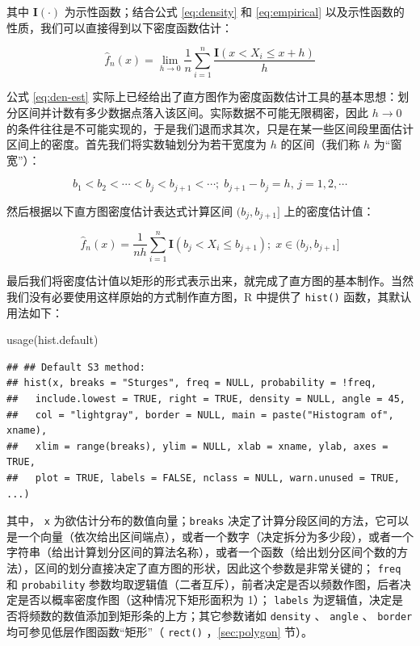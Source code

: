 \documentclass[
  b5paper,
  UTF8,twoside]{book}
\newenvironment{Shaded}{\begin{snugshade}}{\end{snugshade}}
\newcommand{\FunctionTok}[1]{\textcolor[rgb]{0.00,0.00,0.00}{#1}}
\newcommand{\NormalTok}[1]{#1}
\begin{document}
其中 \(\mathbf{I}(\cdot)\) 为示性函数；结合公式 \eqref{eq:density} 和 \eqref{eq:empirical} 以及示性函数的性质，我们可以直接得到以下密度函数估计：

\begin{equation} 
\hat{f}_{n}(x)=\lim_{h\rightarrow0}\frac{1}{n}\sum_{i=1}^{n}\frac{\mathbf{I}(x<X_{i}\leq x+h)}{h}
\label{eq:den-est}
\end{equation}

公式 \eqref{eq:den-est} 实际上已经给出了直方图作为密度函数估计工具的基本思想：划分区间并计数有多少数据点落入该区间。实际数据不可能无限稠密，因此 \(h\rightarrow0\) 的条件往往是不可能实现的，于是我们退而求其次，只是在某一些区间段里面估计区间上的密度。首先我们将实数轴划分为若干宽度为 \(h\) 的区间（我们称 \(h\) 为``窗宽''）：

\begin{equation} 
b_{1}<b_{2}<\cdots<b_{j}<b_{j+1}<\cdots;\;b_{j+1}-b_{j}=h,\,j=1,2,\cdots
\label{eq:den-est2}
\end{equation}

然后根据以下直方图密度估计表达式计算区间 \((b_j,b_{j+1}]\) 上的密度估计值：

\begin{equation} 
\hat{f}_{n}(x)=\frac{1}{nh}\sum_{i=1}^{n}\mathbf{I}(b_{j}<X_{i}\leq b_{j+1});\;x\in(b_{j},b_{j+1}]
\label{eq:den-formula}
\end{equation}

最后我们将密度估计值以矩形的形式表示出来，就完成了直方图的基本制作。当然我们没有必要使用这样原始的方式制作直方图，R 中提供了 \texttt{hist()} 函数，其默认用法如下：

\begin{Shaded}
\begin{Highlighting}[]
\FunctionTok{usage}\NormalTok{(hist.default)}
\end{Highlighting}
\end{Shaded}

\begin{verbatim}
## ## Default S3 method:
## hist(x, breaks = "Sturges", freq = NULL, probability = !freq,
##   include.lowest = TRUE, right = TRUE, density = NULL, angle = 45,
##   col = "lightgray", border = NULL, main = paste("Histogram of", xname),
##   xlim = range(breaks), ylim = NULL, xlab = xname, ylab, axes = TRUE,
##   plot = TRUE, labels = FALSE, nclass = NULL, warn.unused = TRUE, ...)
\end{verbatim}

其中， \texttt{x} 为欲估计分布的数值向量；\texttt{breaks} 决定了计算分段区间的方法，它可以是一个向量（依次给出区间端点），或者一个数字（决定拆分为多少段），或者一个字符串（给出计算划分区间的算法名称），或者一个函数（给出划分区间个数的方法），区间的划分直接决定了直方图的形状，因此这个参数是非常关键的； \texttt{freq} 和 \texttt{probability} 参数均取逻辑值（二者互斥），前者决定是否以频数作图，后者决定是否以概率密度作图（这种情况下矩形面积为 1）； \texttt{labels} 为逻辑值，决定是否将频数的数值添加到矩形条的上方；其它参数诸如 \texttt{density} 、 \texttt{angle} 、 \texttt{border} 均可参见低层作图函数``矩形''（ \texttt{rect()} ，\ref{sec:polygon} 节）。
\end{document}
